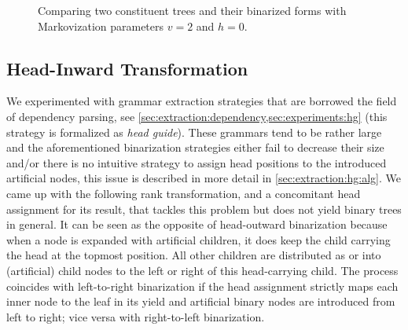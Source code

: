 \documentclass[../../document.tex]{subfiles}
\begin{document}
    \begin{figure}
        \caption{\label{fig:ex:markovization}
            Comparing two constituent trees and their binarized forms with Markovization parameters \(v=2\) and \(h=0\).}
    \end{figure}


    \subsection{Head-Inward Transformation} \label{sec:extraction:bin:hi}
    We experimented with grammar extraction strategies that are borrowed the field of dependency parsing, see \cref{sec:extraction:dependency,sec:experiments:hg} (this strategy is formalized as \emph{head guide}).
    These grammars tend to be rather large and the aforementioned binarization strategies either fail to decrease their size and/or there is no intuitive strategy to assign head positions to the introduced artificial nodes, this issue is described in more detail in \cref{sec:extraction:hg:alg}.
    We came up with the following rank transformation, and a concomitant head assignment for its result, that tackles this problem but does not yield binary trees in general.
    It can be seen as the opposite of head-outward binarization because when a node is expanded with artificial children, it does keep the child carrying the head at the topmost position.
    All other children are distributed as or into (artificial) child nodes to the left or right of this head-carrying child.
    The process coincides with left-to-right binarization if the head assignment strictly maps each inner node to the leaf in its yield and artificial binary nodes are introduced from left to right; vice versa with right-to-left binarization.
\end{document}
